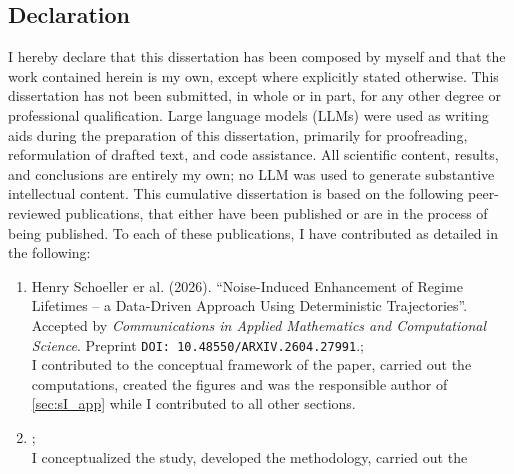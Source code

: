 \begin{center}
\chapter*{Declaration}
I hereby declare that this dissertation has been composed by myself and that
the work contained herein is my own, except where explicitly stated otherwise.
This dissertation has not been submitted, in whole or in part, for any other
degree or professional qualification.
\smallskip
\noindent
Large language models (LLMs) were used as writing aids during the preparation
of this dissertation, primarily for proofreading, reformulation of drafted
text, and code assistance. All scientific content, results, and conclusions
are entirely my own; no LLM was used to generate substantive intellectual
content.
\smallskip
\noindent
This cumulative dissertation is based on the following peer-reviewed
publications, that either have been published or are in the process of being
published. To each of these publications, I have contributed as detailed in the
following:
\begin{enumerate}
    \item %
          Henry Schoeller er al. (2026). \enquote{Noise-Induced Enhancement
              of Regime Lifetimes -- a Data-Driven Approach Using Deterministic
              Trajectories}. Accepted by
          \textit{Communications in Applied Mathematics and Computational Science}.
          Preprint \texttt{DOI: 10.48550/ARXIV.2604.27991}.;\\[0.5em]
          I contributed to the conceptual framework of the paper, carried
          out the computations, created the figures and was the responsible author of
          \cref{sec:sI_app} while I contributed to all other sections.
    \item {};\\[0.5em]
          I conceptualized the study, developed the methodology, carried out the

\end{enumerate}
\end{center}
